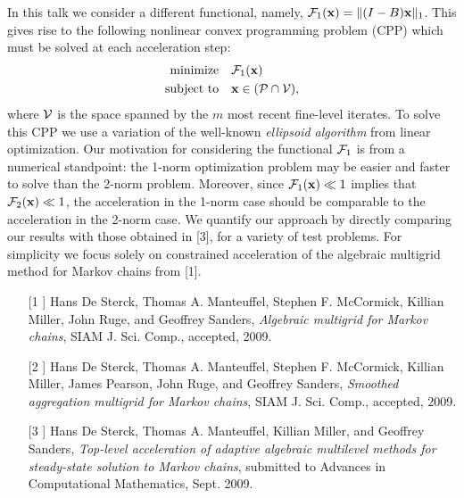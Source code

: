 \documentclass{report}
\begin{document}
In this talk we consider a different functional, namely, $\mathcal{F}_1({\bf x}) =
\|(I-B){\bf x}\|_1$. This gives rise to the following nonlinear convex
programming problem (CPP) which must be solved at each acceleration step:
\begin{align*}
\text{minimize} & \quad \mathcal{F}_1({\bf x})\\
\text{subject to} & \quad {\bf x} \in (\mathcal{P} \cap \mathcal{V}),
\end{align*}
where $\mathcal{V}$ is the space spanned by the $m$ most recent fine-level
iterates. To solve this CPP we use a variation of the well-known {\em
ellipsoid algorithm} from linear optimization. Our motivation for
considering the functional $\mathcal{F}_1$ is from a numerical standpoint: the
1-norm optimization problem may be easier and faster to solve than the
2-norm problem. Moreover, since $\mathcal{F}_1({\bf x}) \ll 1$ implies that
$\mathcal{F}_2({\bf x}) \ll 1$, the acceleration in the 1-norm case should be
comparable to the acceleration in the 2-norm case. We quantify our
approach by directly comparing our results with those obtained in [3],
for a variety of test problems. For simplicity we focus solely on
constrained acceleration of the algebraic multigrid method for Markov
chains from [1].

\vspace{1cm}

{}

\begin{enumerate}
\item[[1]] {\sc Hans De Sterck, Thomas A. Manteuffel, Stephen F.
McCormick, Killian Miller, John Ruge, and Geoffrey Sanders},
{\em Algebraic multigrid for Markov chains}, SIAM J. Sci. Comp., accepted, 2009.

\item[[2]] {\sc Hans De Sterck, Thomas A. Manteuffel, Stephen F.
McCormick, Killian Miller, James Pearson, John Ruge, and Geoffrey
Sanders}, {\em Smoothed aggregation multigrid for Markov chains}, SIAM J.
Sci. Comp., accepted, 2009.

\item[[3]] {\sc Hans De Sterck, Thomas A. Manteuffel, Killian Miller, and
Geoffrey Sanders},
{\em Top-level acceleration of adaptive algebraic multilevel methods for
steady-state solution to Markov
chains}, submitted to Advances in Computational Mathematics, Sept. 2009.
\end{enumerate}
\end{document}
